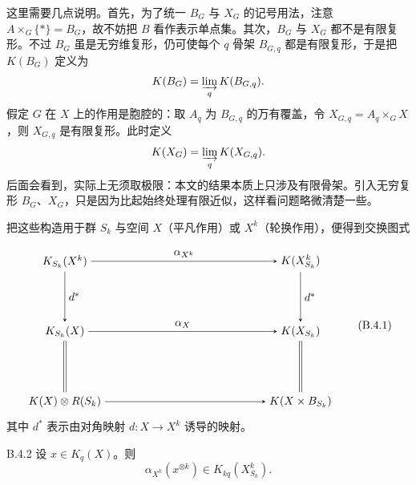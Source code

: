 这里需要几点说明。首先，为了统一 $B_G$ 与 $X_G$ 的记号用法，注意 $A\times_G\{*\}=B_G$，故不妨把 $B$ 看作表示单点集。其次，$B_G$ 与 $X_G$ 都不是有限复形。不过 $B_G$ 虽是无穷维复形，仍可使每个 $q$ 骨架 $B_{G,q}$ 都是有限复形，于是把 $K(B_G)$ 定义为
\[
  K(B_G)=\varinjlim_{q}K(B_{G,q}).
\]
假定 $G$ 在 $X$ 上的作用是胞腔的：取 $A_q$ 为 $B_{G,q}$ 的万有覆盖，令 $X_{G,q}=A_q\times_G X$，则 $X_{G,q}$ 是有限复形。此时定义
\[
  K(X_G)=\varinjlim_{q}K(X_{G,q}).
\]
后面会看到，实际上无须取极限：本文的结果本质上只涉及有限骨架。引入无穷复形 $B_G$、$X_G$，只是因为比起始终处理有限近似，这样看问题略微清楚一些。


把这些构造用于群 $S_k$ 与空间 $X$（平凡作用）或 $X^k$（轮换作用），便得到交换图式

\begin{equation}
  \begin{tikzpicture}[>=stealth, baseline=(current bounding box.center)]
    \node (A1) at (0,2.2) {$K_{S_k}(X^k)$};
    \node (B1) at (7.4,2.2) {$K(X^k_{S_k})$};
    \node (A2) at (0,0) {$K_{S_k}(X)$};
    \node (B2) at (7.4,0) {$K(X_{S_k})$};
    \node (A3) at (0,-2.2) {$K(X)\otimes R(S_k)$};
    \node (B3) at (7.4,-2.2) {$K(X\times B_{S_k})$};
    \draw[->] (A1) -- node[above] {$\alpha_{X^k}$} (B1);
    \draw[->] (A1) -- node[right] {$d^*$} (A2);
    \draw[->] (A2) -- node[above] {$\alpha_X$} (B2);
    \draw[->] (B1) -- node[right] {$d^*$} (B2);
    \draw[double, double distance=1.6pt] (A2) -- (A3);
    \draw[double, double distance=1.6pt] (B2) -- (B3);
    \draw[->] (A3) -- (B3);
  \end{tikzpicture}
  \tag{B.4.1}
\end{equation}
其中 $d^*$ 表示由对角映射 $d\colon X\to X^k$ 诱导的映射。

\begin{proposition*}{B.4.2}
  设 $x\in K_q(X)$。则
  \[
    \alpha_{X^k}(x^{\otimes k})\in K_{kq}(X^k_{S_k}).
  \]
\end{proposition*}

